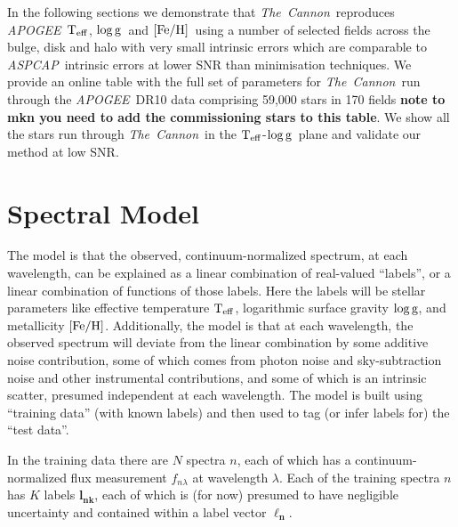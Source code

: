 \documentclass[12pt, preprint]{aastex}
\newcommand{\teff}{\mbox{$\rm T_{eff}$}}
\newcommand{\feh}{\mbox{$\rm [Fe/H]$}}
\newcommand{\logg}{\mbox{$\rm \log g$}}
\newcommand{\tc}{\textsl{The~Cannon}}
\newcommand{\apogee}{\textsl{APOGEE}}
\newcommand{\aspcap}{\textsl{ASPCAP}}
\begin{document}


In the following sections we demonstrate that \tc\ reproduces \apogee\ \teff, \logg\ and \feh\ using a number of selected fields across the bulge, disk and halo with very small intrinsic errors which are comparable to \aspcap\ intrinsic errors at lower SNR than minimisation techniques. We provide an online table with the full set of parameters for \tc\ run through the \apogee\ DR10 data comprising 59,000 stars in 170 fields \textbf{note to mkn you need to add the commissioning stars to this table}.  We show all the stars run through \tc\ in the \teff-\logg\ plane and validate our method at low SNR.



\section{Spectral Model}
\label{sec:spectralmodel}

The model is that the observed, continuum-normalized spectrum, at each
wavelength, can be explained as a linear combination of real-valued
``labels'', or a linear combination of functions of those labels.
Here the labels will be stellar parameters like effective temperature $\teff$,
logarithmic surface gravity $\logg$, and metallicity $\feh$.
Additionally, the model is that at each wavelength, the observed
spectrum will deviate from the linear combination by some additive
noise contribution, some of which comes from photon noise and
sky-subtraction noise and other instrumental contributions, and some
of which is an intrinsic scatter, presumed independent at each
wavelength.
The model is built using ``training data'' (with known labels) and then
used to tag (or infer labels for) the ``test data''.

In the training data there are $N$ spectra $n$, each of which has
a continuum-normalized flux measurement $f_{n\lambda}$ at wavelength
$\lambda$. Each of the training spectra $n$ has $K$ labels $\boldsymbol{l_{nk}}$, each of which
is (for now) presumed to have negligible uncertainty and contained within a label vector $\boldsymbol{\ell_n}$.
\end{document}
